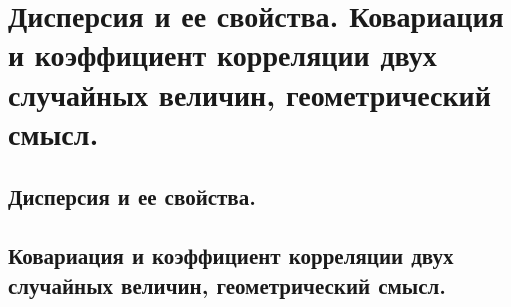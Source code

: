 \section{Дисперсия и ее свойства. Ковариация и коэффициент корреляции двух случайных величин, геометрический смысл.}

\subsection{Дисперсия и ее свойства.}

\subsection{Ковариация и коэффициент корреляции двух случайных величин, геометрический смысл.}